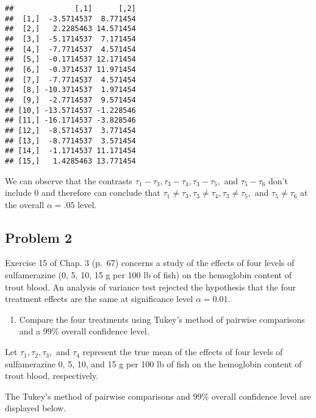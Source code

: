 \documentclass[12pt,]{article}
\providecommand{\tightlist}{%
  \setlength{\itemsep}{0pt}\setlength{\parskip}{0pt}}
\begin{document}
\begin{verbatim}
##              [,1]      [,2]
##  [1,]  -3.5714537  8.771454
##  [2,]   2.2285463 14.571454
##  [3,]  -5.1714537  7.171454
##  [4,]  -7.7714537  4.571454
##  [5,]  -0.1714537 12.171454
##  [6,]  -0.3714537 11.971454
##  [7,]  -7.7714537  4.571454
##  [8,] -10.3714537  1.971454
##  [9,]  -2.7714537  9.571454
## [10,] -13.5714537 -1.228546
## [11,] -16.1714537 -3.828546
## [12,]  -8.5714537  3.771454
## [13,]  -8.7714537  3.571454
## [14,]  -1.1714537 11.171454
## [15,]   1.4285463 13.771454
\end{verbatim}

We can observe that the contrasts
\(\tau_1 - \tau_3, \tau_3 - \tau_4, \tau_3 - \tau_5,\) and
\(\tau_5 - \tau_6\) don't include 0 and therefore can conclude that
\(\tau_1 \neq \tau_3, \tau_3 \neq \tau_4, \tau_3 \neq \tau_5,\) and
\(\tau_5 \neq \tau_6\) at the overall \(\alpha=.05\) level.

\subsection{Problem 2}\label{problem-2}

Exercise 15 of Chap. 3 (p.~67) concerns a study of the effects of four
levels of sulfamerazine (0, 5, 10, 15 g per 100 lb of fish) on the
hemoglobin content of trout blood. An analysis of variance test rejected
the hypothesis that the four treatment effects are the same at
significance level \(\alpha=0.01\).

\begin{enumerate}
\def\labelenumi{(\alph{enumi})}
\tightlist
\item
  Compare the four treatments using Tukey's method of pairwise
  comparisons and a 99\% overall confidence level.
\end{enumerate}

Let \(\tau_1,\tau_2,\tau_3,\) and \(\tau_4\) represent the true mean of
the effects of four levels of sulfamerazine 0, 5, 10, and 15 g per 100
lb of fish on the hemoglobin content of trout blood, respectively.

The Tukey's method of pairwise comparisons and 99\% overall confidence
level are displayed below.
\end{document}
